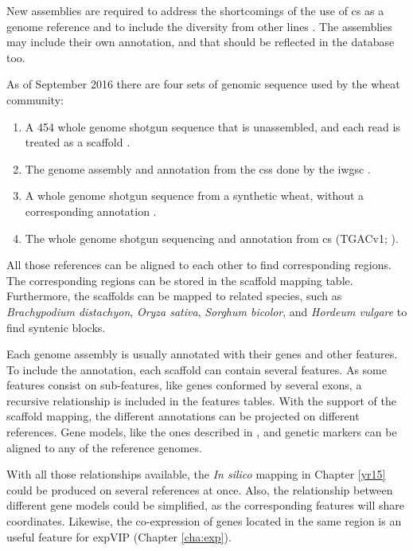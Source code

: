 New assemblies are required to address the shortcomings of the use of \acrshort{cs} as a genome reference and to include the diversity from other lines \citep{Allen2016,Winfield2016}. 
The assemblies may include their own annotation, and that should be reflected in the database too. 

As of September 2016 there are four sets of genomic sequence used by the wheat community:
\begin{enumerate}
	\item  A 454 whole genome shotgun sequence that is unassembled, and each read is treated as a scaffold \citep{Brenchley2012}.
	\item The genome assembly and annotation from the \gls{css} done by the \acrshort{iwgsc} \citep{Mayer2014}.
	\item A whole genome shotgun sequence from a synthetic wheat, without a corresponding annotation \citep{Chapman2015}.
	\item The whole genome shotgun sequencing and annotation from \acrshort{cs} (TGACv1; \citealt{Clark2016}).
\end{enumerate}

All those references can be aligned to each other to find corresponding regions. 
The corresponding regions can be stored in the scaffold mapping table. 
Furthermore, the scaffolds can be mapped to related species, such as \textit{Brachypodium distachyon}, \textit{Oryza sativa}, \textit{Sorghum bicolor}, and \textit{Hordeum vulgare} to find syntenic blocks. 

Each genome assembly is usually annotated with their genes and other features. 
To include the annotation, each scaffold can contain several features. 
As some features consist on sub-features, like genes conformed by several exons, a recursive relationship is included in the features tables. 
With the support of the scaffold mapping, the different annotations can be projected on different references. 
Gene models, like the ones described in \citep{Krasileva2013}, and  genetic markers can be aligned to any of the reference genomes.

With all those relationships available, the \textit{In silico} mapping in Chapter \ref{yr15} could be produced on several references at once. 
Also, the relationship between different gene models could be simplified, as the corresponding features will share coordinates.
Likewise, the co-expression of genes located in the same region is an useful feature for expVIP (Chapter \ref{cha:exp}). 

